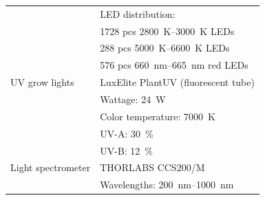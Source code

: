\begin{table}[htbp]
\begin{tabularx}{\linewidth}{l|X}
        & \quad LED distribution: \\
        & \quad \quad \num[mode=text]{1728} pcs \qtyrange[mode=text, range-phrase=\textendash, range-units=single]{2800}{3000}{\K} LEDs \\
        & \quad \quad \num[mode=text]{288} pcs \qtyrange[mode=text, range-phrase=\textendash, range-units=single]{5000}{6600}{\K} LEDs \\
        & \quad \quad \num[mode=text]{576} pcs \qtyrange[mode=text, range-phrase=\textendash, range-units=single]{660}{665}{\nm} red LEDs \\
        \bigstrut
        UV grow lights\index{grow light!UV} & LuxElite PlantUV (fluorescent tube)\index{grow light!UV!LuxElite PlantUV} \\
        & \quad Wattage: \qty[mode=text]{24}{\W} \\
        & \quad Color temperature: \qty[mode=text]{7000}{\K} \\
        & \quad UV-A: \qty[mode=text]{30}{\percent} \\
        & \quad UV-B: \qty[mode=text]{12}{\percent} \\
        \bigstrut
        Light spectrometer\index{light spectrometer} & THORLABS CCS200/M\index{light spectrometer!THORLABS CCS200/M} \\
        & \quad Wavelengths: \qtyrange[mode=text, range-phrase=\textendash, range-units=single]{200}{1000}{\nm} \\
        \bottomrule
    \end{tabularx}
\end{table}

